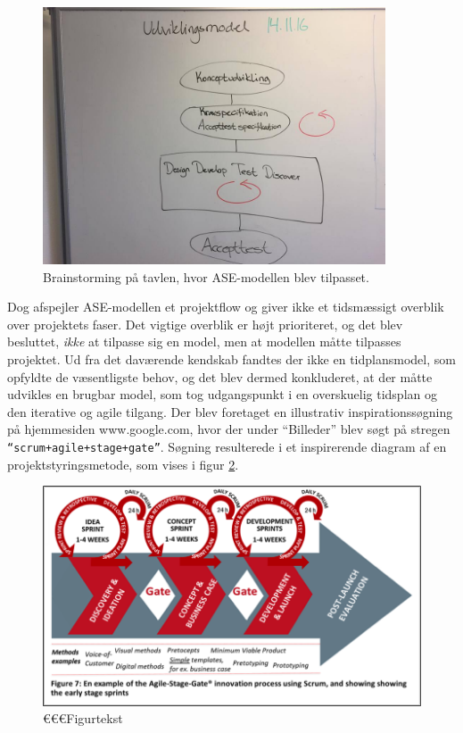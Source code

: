 	\begin{figure}[htb]
		\centering
		\includegraphics[width=4in]{ASEbrain.jpg}
		\caption{Brainstorming på tavlen, hvor ASE-modellen blev tilpasset.}
		\label{fig:ASEbrain}	
	\end{figure}
	
	 Dog afspejler ASE-modellen et projektflow og  giver ikke et tidsmæssigt overblik over projektets faser. Det vigtige overblik er højt prioriteret, og det blev besluttet, \textit{ikke} at tilpasse sig en model, men at modellen måtte tilpasses projektet. Ud fra det daværende kendskab fandtes der ikke en tidplansmodel, som opfyldte de væsentligste behov, og det blev dermed konkluderet, at der måtte udvikles en brugbar model, som tog udgangspunkt i en overskuelig tidsplan og den iterative og agile tilgang. Der blev foretaget en illustrativ inspirationssøgning på hjemmesiden www.google.com, hvor der under “Billeder” blev søgt på stregen \texttt{“scrum+agile+stage+gate”}. Søgning resulterede i et inspirerende diagram af en projektstyringsmetode, som vises i figur \ref{fig:inspidia}.  
	
	\begin{figure}[htb]
		\centering
		\includegraphics[width=5in]{inspirerendediagram}
		\caption{€€€Figurtekst}
		\label{fig:inspidia}	
	\end{figure}

